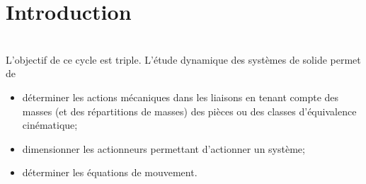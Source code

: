 %
%
%
%
%
%
%
%
%
%
%
%
%
%
%
%
%
%		
%
%
%
%
%
%
%



\section{Introduction}
\begin{obj} ~\\
L'objectif de ce cycle est triple. L'étude dynamique des systèmes de solide permet de 
\begin{itemize}
\item déterminer les actions mécaniques dans les liaisons en tenant compte des masses (et des répartitions de masses) des pièces ou des classes d'équivalence cinématique;
\item dimensionner les actionneurs permettant d'actionner un système; 
\item déterminer les équations de mouvement.
\end{itemize}
\end{obj}



